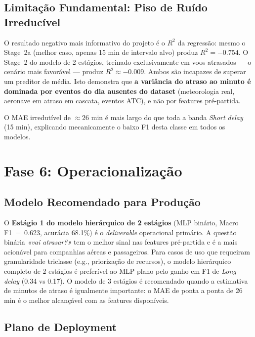 \documentclass[conference]{IEEEtran}
\begin{document}
\subsection{Limitação Fundamental: Piso de Ruído Irreducível}

O resultado negativo mais informativo do projeto é o $R^2$ da regressão: mesmo o
Stage~2a (melhor caso, apenas 15 min de intervalo alvo) produz $R^2 = -0.754$. O
Stage~2 do modelo de 2 estágios, treinado exclusivamente em voos atrasados — o
cenário mais favorável — produz $R^2 \approx -0.009$. Ambos são incapazes de superar
um preditor de média. Isto demonstra que \textbf{a variância do atraso ao minuto é
dominada por eventos do dia ausentes do dataset} (meteorologia real, aeronave em
atraso em cascata, eventos ATC), e não por features pré-partida.

O MAE irredutível de $\approx 26$ min é mais largo do que toda a banda \textit{Short
delay} (15 min), explicando mecanicamente o baixo F1 desta classe em todos os modelos.

\section{Fase 6: Operacionalização}

\subsection{Modelo Recomendado para Produção}

O \textbf{Estágio 1 do modelo hierárquico de 2 estágios} (MLP binário, Macro
F1~=~0.623, acurácia 68.1\%) é o \textit{deliverable} operacional primário. A
questão binária \textit{«vai atrasar?»} tem o melhor sinal nas features pré-partida e
é a mais acionável para companhias aéreas e passageiros. Para casos de uso que
requeiram granularidade triclasse (e.g., priorização de recursos), o modelo
hierárquico completo de 2 estágios é preferível ao MLP plano pelo ganho em F1 de
\textit{Long delay} (0.34 vs 0.17). O modelo de 3 estágios é recomendado quando a
estimativa de minutos de atraso é igualmente importante: o MAE de ponta a ponta
de 26 min é o melhor alcançável com as features disponíveis.

\subsection{Plano de Deployment}
\end{document}
